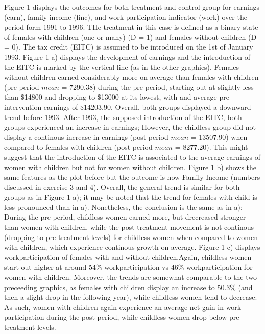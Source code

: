 \documentclass[a4paper]{article}
\begin{document}
Figure 1 displays the outcomes for both treatment and control group for earnings (earn), family income (finc), and work-participation indicator (work) over the period form 1991 to 1996. THe treatment in this case is defined as a binary state of females with children (one or many) (D = 1) and females without children (D = 0). The tax credit (EITC) is assumed to be introduced on the 1st of January 1993.
\indent Figure 1 a) displays the development of earnings and the introduction of the EITC is marked by the vertical line (as in the other graphics). Females without children earned considerably more on average than females with children (pre-period $mean$ = 7290.38) during the pre-period, starting out at slightly less than \$14800 and dropping to \$13000 at its lowest, with and average pre-intervention earnings of \$14203.90. Overall, both groups displayed a downward trend before 1993. After 1993, the supposed introduction of the EITC, both groups experienced an increase in earnings; However, the childless group did not display a continous increase in earnings (post-period $mean$  = 13507.90) when compared to females with children (post-period $mean$  = 8277.20). This might suggest that the introduction of the  EITC is associated to the average earnings of women with children but not for women without children.
\indent Figure 1 b) shows the same features as the plot before but the outcome is now Family Income (numbers discussed in exercise 3 and 4). Overall, the general trend is similar for both groups as in Figure 1 a); it may be noted that the trend for females with child is less pronounced than in a). Nonetheless, the conclusion is the same as in a): During the pre-period, childless women earned more, but drecreased stronger than women with children, while the post treatment movement is not continous (dropping to pre treatment levels) for childless women when compared to women with children, which experience continous growth on average.
\indent Figure 1 c) displays workparticipation of females with and without children.Again, childless women start out higher at around 54\% workparticipation vs 46\% workparticipation for women with children. Moreover, the trends are somewhat comparable to the two preceeding graphics, as females with children display an increase to 50.3\% (and then a slight drop in the following year), while childless women tend to decrease: As such, women with children again experience an average net gain in work participation during the post period, while childless women drop below pre-treatment levels. 
\end{document}
